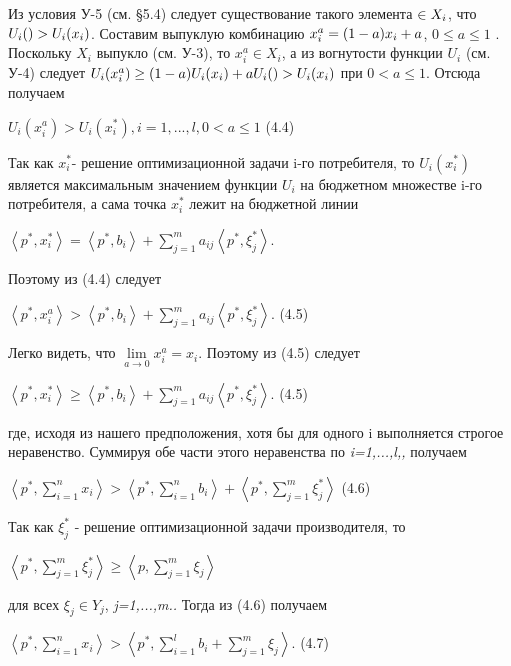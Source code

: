 \documentclass[12pt, 4paper]{book}
\begin{document}
{Из условия У-5 (см. §5.4) следует существование такого элемента $\title{x_i} \in X_i$, что $U_i(\title{x_i})> U_i(x_i)$. Составим выпуклую комбинацию $x_{i}^{a} = (1-a)x_i + a \title{x_i}$, $0 \leq a \leq 1 $ . Поскольку $X_i$ выпукло (см. У-3), то $x_{i}^{a} \in X_i$, а из вогнутости функции $U_i$ (см. У-4) следует $U_i(x_{i}^{a}) \geq (1-a)U_i(x_i) + a U_i(\title{x_i}) > U_i(x_i)$ при $0 < a \leq 1$. Отсюда получаем
\begin{center}
$U_{i}(x_{i}^{a})> U_i(x_{i}^{*}),i=1,...,l, 0 < a \leq 1$ (4.4)
\end{center}
\par

Так как $x_{i}^{*}$- решение оптимизационной задачи i-го потребителя, то $U_{i}(x_{i}^{*})$ является максимальным значением функции $U_i$ на бюджетном множестве i-го потребителя, а сама точка $x_{i}^{*}$ лежит на бюджетной линии
\begin{center}
$\left\langle p^{*}, x_{i}^{*} \right\rangle = \left\langle p^{*},b_i \right\rangle + \sum\limits_{j=1}^m a_{ij} \left\langle p^{*},\xi_{j}^{*} \right\rangle$.
\end{center}
Поэтому из (4.4) следует
\begin{center}
$\left\langle p^{*}, x_{i}^{a} \right\rangle > \left\langle p^{*},b_i \right\rangle + \sum\limits_{j=1}^m a_{ij} \left\langle p^{*},\xi_{j}^{*} \right\rangle$. (4.5)
\end{center}
Легко видеть, что $\lim\limits_{a \rightarrow 0} x_{i}^{a} = x_i.$ Поэтому из (4.5) следует
\begin{center}
$\left\langle p^{*}, x_{i}^{*} \right\rangle \geq \left\langle p^{*},b_i \right\rangle + \sum\limits_{j=1}^m a_{ij} \left\langle p^{*},\xi_{j}^{*} \right\rangle$. (4.5)
\end{center}
где, исходя из нашего предположения, хотя бы для одного i выполняется строгое неравенство. Суммируя обе части этого неравенства по \textit{i=1,...,l,,} получаем
\begin{center}
$\left\langle p^{*},\sum\limits_{i=1}^n x_i\right\rangle > \left\langle  p^{*}, \sum\limits_{i=1}^n b_i\right\rangle + \left\langle p^{*}, \sum\limits_{j=1}^m \xi_{j}^{*}\right\rangle$ (4.6)
\end{center}
Так как $\xi_{j}^{*}$ - решение оптимизационной задачи производителя, то
\begin{center}
$\left\langle p^{*}, \sum\limits_{j=1}^m \xi_{j}^{*}\right\rangle \geq \left\langle p,\sum\limits_{j=1}^{m} \xi_{j}\right\rangle$
\end{center}
для всех $\xi_j \in Y_j$, \textit{j=1,...,m..} Тогда из (4.6) получаем
\begin{center}
$\left\langle p^{*},\sum\limits_{i=1}^n x_i\right\rangle >\left\langle p^{*}, \sum\limits_{i=1}^{l} b_i + \sum\limits_{j=1}^m \xi_j \right\rangle$. (4.7)
\end{center}
\par

}
\end{document}
